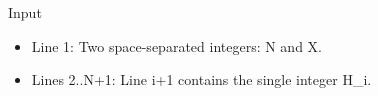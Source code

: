 Input
\begin{itemize}
	\item      Line 1: Two space-separated integers: N and X.    
	\item      Lines 2..N+1: Line i+1 contains the single integer H\_i.    
\end{itemize}